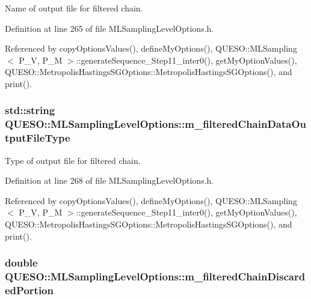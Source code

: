 Name of output file for filtered chain. 



Definition at line 265 of file M\-L\-Sampling\-Level\-Options.\-h.



Referenced by copy\-Options\-Values(), define\-My\-Options(), Q\-U\-E\-S\-O\-::\-M\-L\-Sampling$<$ P\-\_\-\-V, P\-\_\-\-M $>$\-::generate\-Sequence\-\_\-\-Step11\-\_\-inter0(), get\-My\-Option\-Values(), Q\-U\-E\-S\-O\-::\-Metropolis\-Hastings\-S\-G\-Options\-::\-Metropolis\-Hastings\-S\-G\-Options(), and print().

\hypertarget{class_q_u_e_s_o_1_1_m_l_sampling_level_options_a154ba7fd5c2fbc98af0ac91bb022a232}{
\subsubsection[{m\-\_\-filtered\-Chain\-Data\-Output\-File\-Type}]{\setlength{\rightskip}{0pt plus 5cm}std\-::string Q\-U\-E\-S\-O\-::\-M\-L\-Sampling\-Level\-Options\-::m\-\_\-filtered\-Chain\-Data\-Output\-File\-Type}}\label{class_q_u_e_s_o_1_1_m_l_sampling_level_options_a154ba7fd5c2fbc98af0ac91bb022a232}


Type of output file for filtered chain. 



Definition at line 268 of file M\-L\-Sampling\-Level\-Options.\-h.



Referenced by copy\-Options\-Values(), define\-My\-Options(), Q\-U\-E\-S\-O\-::\-M\-L\-Sampling$<$ P\-\_\-\-V, P\-\_\-\-M $>$\-::generate\-Sequence\-\_\-\-Step11\-\_\-inter0(), get\-My\-Option\-Values(), Q\-U\-E\-S\-O\-::\-Metropolis\-Hastings\-S\-G\-Options\-::\-Metropolis\-Hastings\-S\-G\-Options(), and print().

\hypertarget{class_q_u_e_s_o_1_1_m_l_sampling_level_options_a22220cb7fbdef58a009733f8cf1887f9}{
\subsubsection[{m\-\_\-filtered\-Chain\-Discarded\-Portion}]{\setlength{\rightskip}{0pt plus 5cm}double Q\-U\-E\-S\-O\-::\-M\-L\-Sampling\-Level\-Options\-::m\-\_\-filtered\-Chain\-Discarded\-Portion}}\label{class_q_u_e_s_o_1_1_m_l_sampling_level_options_a22220cb7fbdef58a009733f8cf1887f9}


